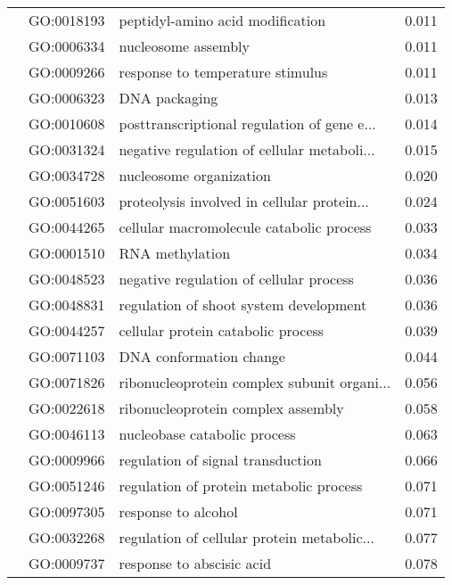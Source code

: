 \begin{longtable}{lllr}
   & GO:0018193 &             peptidyl-amino acid modification &         0.011 \\
   & GO:0006334 &                          nucleosome assembly &         0.011 \\
   & GO:0009266 &             response to temperature stimulus &         0.011 \\
   & GO:0006323 &                                DNA packaging &         0.013 \\
   & GO:0010608 &  posttranscriptional regulation of gene e... &         0.014 \\
   & GO:0031324 &  negative regulation of cellular metaboli... &         0.015 \\
   & GO:0034728 &                      nucleosome organization &         0.020 \\
   & GO:0051603 &  proteolysis involved in cellular protein... &         0.024 \\
   & GO:0044265 &     cellular macromolecule catabolic process &         0.033 \\
   & GO:0001510 &                              RNA methylation &         0.034 \\
   & GO:0048523 &      negative regulation of cellular process &         0.036 \\
   & GO:0048831 &       regulation of shoot system development &         0.036 \\
   & GO:0044257 &           cellular protein catabolic process &         0.039 \\
   & GO:0071103 &                      DNA conformation change &         0.044 \\
   & GO:0071826 &  ribonucleoprotein complex subunit organi... &         0.056 \\
   & GO:0022618 &           ribonucleoprotein complex assembly &         0.058 \\
   & GO:0046113 &                 nucleobase catabolic process &         0.063 \\
   & GO:0009966 &            regulation of signal transduction &         0.066 \\
   & GO:0051246 &      regulation of protein metabolic process &         0.071 \\
   & GO:0097305 &                          response to alcohol &         0.071 \\
   & GO:0032268 &  regulation of cellular protein metabolic... &         0.077 \\
   & GO:0009737 &                    response to abscisic acid &         0.078 \\

\end{longtable}
